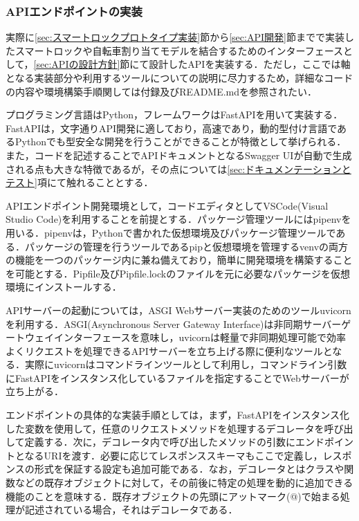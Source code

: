       \subsubsection{APIエンドポイントの実装}
        \label{sec:APIエンドポイントの実装}
          \par 実際に\ref{sec:スマートロックプロトタイプ実装}節から\ref{sec:API開発}節までで実装したスマートロックや自転車割り当てモデルを結合するためのインターフェースとして，\ref{sec:APIの設計方針}節にて設計したAPIを実装する．ただし，ここでは軸となる実装部分や利用するツールについての説明に尽力するため，詳細なコードの内容や環境構築手順関しては付録及びREADME.mdを参照されたい．
          \par プログラミング言語はPython，フレームワークはFastAPIを用いて実装する．FastAPIは，文字通りAPI開発に適しており，高速であり，動的型付け言語であるPythonでも型安全な開発を行うことができることが特徴として挙げられる．また，コードを記述することでAPIドキュメントとなるSwagger UIが自動で生成される点も大きな特徴であるが，その点については\ref{sec:ドキュメンテーションとテスト}項にて触れることとする．
          \par APIエンドポイント開発環境として，コードエディタとしてVSCode(Visual Studio Code)を利用することを前提とする．パッケージ管理ツールにはpipenv\cite{pipenv}を用いる．pipenvは，Pythonで書かれた仮想環境及びパッケージ管理ツールである．パッケージの管理を行うツールであるpipと仮想環境を管理するvenvの両方の機能を一つのパッケージ内に兼ね備えており，簡単に開発環境を構築することを可能とする．Pipfile及びPipfile.lockのファイルを元に必要なパッケージを仮想環境にインストールする．
          \par APIサーバーの起動については，ASGI Webサーバー実装のためのツールuvicorn\cite{uvicorn}を利用する．ASGI(Asynchronous Server Gateway Interface)は非同期サーバーゲートウェイインターフェースを意味し，uvicornは軽量で非同期処理可能で効率よくリクエストを処理できるAPIサーバーを立ち上げる際に便利なツールとなる．実際にuvicornはコマンドラインツールとして利用し，コマンドライン引数にFastAPIをインスタンス化しているファイルを指定することでWebサーバーが立ち上がる．
          \par エンドポイントの具体的な実装手順としては，まず，FastAPIをインスタンス化した変数を使用して，任意のリクエストメソッドを処理するデコレータを呼び出して定義する．次に，デコレータ内で呼び出したメソッドの引数にエンドポイントとなるURIを渡す．必要に応じてレスポンススキーマもここで定義し，レスポンスの形式を保証する設定も追加可能である．なお，デコレータとはクラスや関数などの既存オブジェクトに対して，その前後に特定の処理を動的に追加できる機能のことを意味する．既存オブジェクトの先頭にアットマーク(@)で始まる処理が記述されている場合，それはデコレータである．

